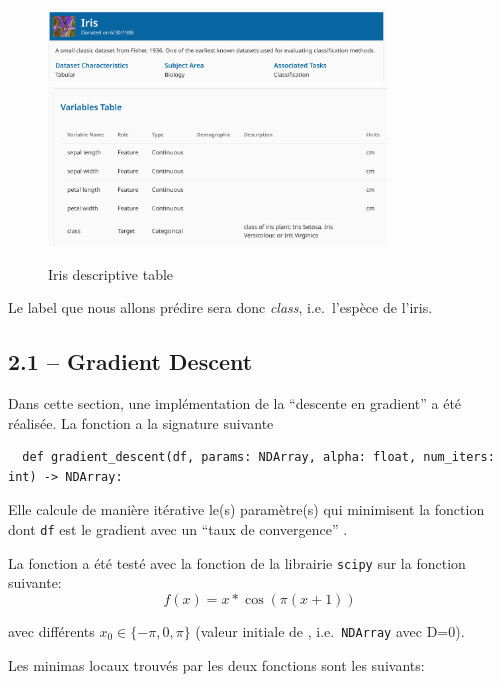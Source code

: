 \documentclass[
]{article}
\begin{document}
\begin{figure}
\centering
\includegraphics[width=0.8\textwidth,height=\textheight]{../res/iris_img.png}
\includegraphics[width=0.8\textwidth,height=\textheight]{../res/iris_table.png}
\caption{Iris descriptive table}
\end{figure}

Le label que nous allons prédire sera donc \emph{class}, i.e.~l'espèce
de l'iris.

\newpage

\subsection{2.1 -- Gradient Descent}\label{gradient-descent}

Dans cette section, une implémentation de la ``descente en gradient'' a
été réalisée. La fonction a la signature suivante

\begin{lstlisting}
  def gradient_descent(df, params: NDArray, alpha: float, num_iters: int) -> NDArray:  
\end{lstlisting}

Elle calcule de manière itérative le(s) paramètre(s)  qui
minimisent la fonction dont \texttt{df} est le gradient avec un ``taux
de convergence'' .

La fonction a été testé avec la fonction 
\cite{ScipyOptimizeFmin} de la librairie \texttt{scipy} sur la fonction
suivante: \[
f(x) = x * \cos(\pi  (x + 1))
\]

avec différents \(x_0 \in \{-\pi, 0, \pi\}\) (valeur initiale de
, i.e.~\texttt{NDArray} avec D=0).

Les minimas locaux trouvés par les deux fonctions sont les suivants:
\end{document}
